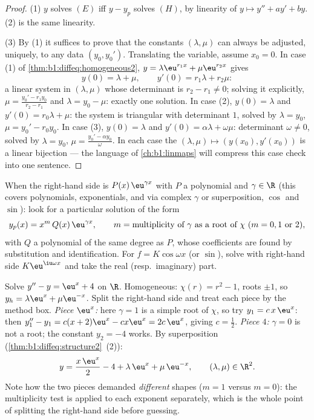 \begin{proof}
(1) $y$ solves $(E)$ iff $y - y_p$ solves $(H)$, by linearity of $y
\mapsto y'' + ay' + by$. (2) is the same linearity.

(3) By (1) it suffices to prove that the constants $(\lambda,
\mu)$ can always be adjusted, uniquely, to any data $(y_0, y_0')$.
Translating the variable, assume $x_0 = 0$. In case (1) of
\cref{thm:b1:diffeq:homogeneous2}, $y = \lambda\eu^{r_1x} +
\mu\eu^{r_2x}$ gives
\[
y(0) = \lambda + \mu, \qquad y'(0) = r_1\lambda + r_2\mu :
\]
a linear system in $(\lambda, \mu)$ whose determinant is $r_2 -
r_1 \neq 0$; solving it explicitly, $\mu = \frac{y_0' -
r_1y_0}{r_2 - r_1}$ and $\lambda = y_0 - \mu$: exactly one
solution. In case (2), $y(0) = \lambda$ and $y'(0) = r_0\lambda +
\mu$: the system is triangular with determinant $1$, solved by
$\lambda = y_0$, $\mu = y_0' - r_0y_0$. In case (3), $y(0) =
\lambda$ and $y'(0) = \alpha\lambda + \omega\mu$: determinant
$\omega \neq 0$, solved by $\lambda = y_0$, $\mu = \frac{y_0' -
\alpha y_0}\omega$. In each case the  $(\lambda, \mu) \mapsto
(y(x_0), y'(x_0))$ is a linear bijection --- the language of
\cref{ch:b1:linmaps} will compress this case check into one
sentence.
\end{proof}

\begin{method}[Particular solution for $f(x) = P(x)\,\eu^{\gamma x}$]\label{met:b1:diffeq:particular}
When the right-hand side is $P(x)\,\eu^{\gamma x}$ with $P$ a
polynomial and $\gamma \in \R$ (this covers polynomials, exponentials,
and via complex $\gamma$ or superposition, $\cos$ and $\sin$): look
for a particular solution of the form
\[
y_p(x) = x^{m}\, Q(x)\, \eu^{\gamma x},
\qquad
m = \text{multiplicity of } \gamma \text{ as a root of } \chi
\ (m = 0, 1 \text{ or } 2),
\]
with $Q$ a polynomial of the same degree as $P$, whose coefficients
are found by substitution and identification. For $f = K\cos\omega x$
(or $\sin$), solve with right-hand side $K\eu^{\iu\omega x}$ and take
the real (resp.\ imaginary) part.
\end{method}

\begin{example}\label{ex:b1:diffeq:superposition}
Solve $y'' - y = \eu^{x} + 4$ on $\R$. Homogeneous: $\chi(r) = r^2
- 1$, roots $\pm1$, so $y_h = \lambda\eu^x + \mu\eu^{-x}$. Split
the right-hand side and treat each piece by the method box.
\emph{Piece $\eu^x$:} here $\gamma = 1$ is a simple root of
$\chi$, so try $y_1 = c\,x\,\eu^x$: then $y_1'' - y_1 = c(x +
2)\eu^x - cx\eu^x = 2c\,\eu^x$, giving $c = \frac12$.
\emph{Piece $4$:} $\gamma = 0$ is not a root; the constant $y_2 =
-4$ works. By superposition
(\cref{thm:b1:diffeq:structure2}~(2)):
\[
y = \frac{x\,\eu^x}2 - 4 + \lambda\,\eu^x + \mu\,\eu^{-x},
\qquad (\lambda, \mu) \in \R^2 .
\]
Note how the two pieces demanded \emph{different} shapes ($m = 1$
versus $m = 0$): the multiplicity test is applied to each
exponent separately, which is the whole point of splitting the
right-hand side before guessing.
\end{example}


